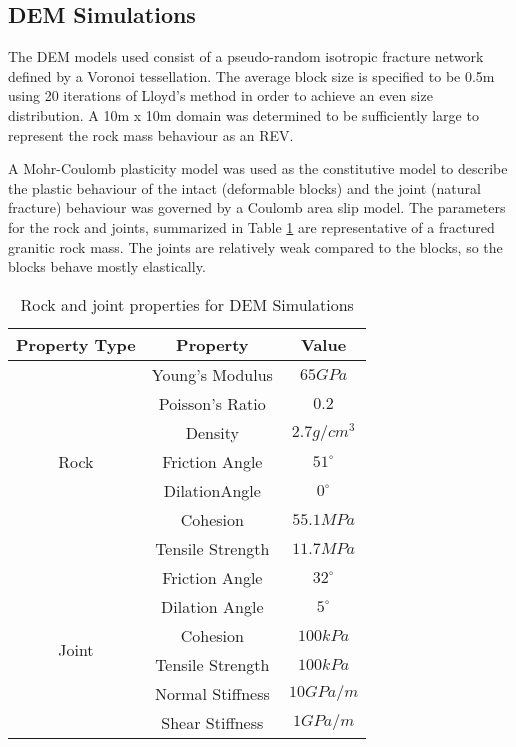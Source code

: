 \subsection{DEM Simulations}

The DEM models used consist of a pseudo-random isotropic fracture network defined by a Voronoi tessellation. The average block size is specified to be 0.5m using 20 iterations of Lloyd's method \citep{Lloyd_1982} in order to achieve an even size distribution. A 10m x 10m domain was determined to be sufficiently large to represent the rock mass behaviour as an REV. 

A Mohr-Coulomb plasticity model was used as the constitutive model to describe the plastic behaviour of the intact  (deformable blocks) and the joint (natural fracture) behaviour was governed by a Coulomb area slip model. The parameters for the rock and joints, summarized in Table \ref{tab:demProp} are representative of a fractured granitic rock mass. The joints are relatively weak compared to the blocks, so the blocks behave mostly elastically. 

\begin{table}[!htbp]
\centering
\caption{Rock and joint properties for DEM Simulations}
\label{tab:demProp}
\begin{tabular}{@{}ccc@{}}
\toprule
\textbf{Property Type} & \textbf{Property} & \textbf{Value} \\ \midrule
\multirow{7}{*}{Rock}  & Young's Modulus   & $65 GPa$       \\
                       & Poisson's Ratio   & $0.2$          \\
                       & Density           & $2.7 g/cm^3$   \\
                       & Friction Angle    & $51^{\circ}$   \\
                       & DilationAngle     & $0^{\circ}$    \\
                       & Cohesion          & $55.1 MPa$     \\
                       & Tensile Strength  & $11.7 MPa$     \\ \cmidrule(r){1-1}
\multirow{6}{*}{Joint} & Friction Angle    & $32^{\circ}$   \\
                       & Dilation Angle    & $5^{\circ}$    \\
                       & Cohesion          & $100 kPa$      \\
                       & Tensile Strength  & $100 kPa$      \\
                       & Normal Stiffness  & $10 GPa/m$     \\
                       & Shear Stiffness   & $1 GPa/m$      \\ \cmidrule(l){2-3} 
\end{tabular}
\end{table}


